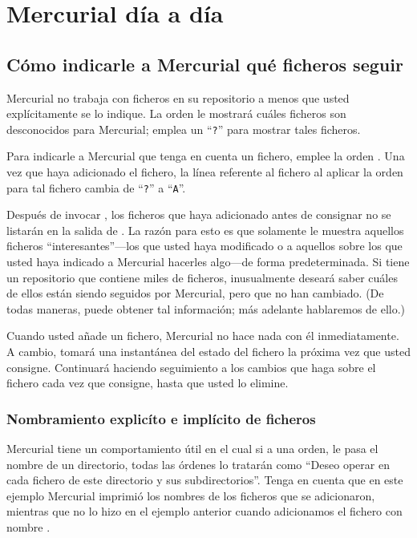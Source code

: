\chapter{Mercurial día a día}
\label{chap:daily}

\section{Cómo indicarle a Mercurial qué ficheros seguir}

Mercurial no trabaja con ficheros en su repositorio a menos que usted
explícitamente se lo indique.  La orden  le mostrará
cuáles ficheros son desconocidos para Mercurial; emplea un
``\texttt{?}'' para mostrar tales ficheros.

Para indicarle a Mercurial que tenga en cuenta un fichero, emplee la
orden . Una vez que haya adicionado el fichero, la línea
referente al fichero al aplicar la orden  para tal
fichero cambia de ``\texttt{?}'' a ``\texttt{A}''.

Después de invocar , los ficheros que haya adicionado
antes de consignar no se listarán en la salida de .  La
razón para esto es que  solamente le muestra aquellos
ficheros ``interesantes''---los que usted haya modificado o a aquellos
sobre los que usted haya indicado a Mercurial hacerles algo---de forma
predeterminada. Si tiene un repositorio que contiene miles de
ficheros, inusualmente deseará saber cuáles de ellos están siendo
seguidos por Mercurial, pero que no han cambiado.  (De todas maneras,
puede obtener tal información; más adelante hablaremos de ello.)


Cuando usted añade un fichero, Mercurial no hace nada con él inmediatamente.
A cambio, tomará una instantánea del estado del fichero la próxima vez
que usted consigne. Continuará haciendo seguimiento a los cambios que
haga sobre el fichero cada vez que consigne, hasta que usted lo elimine.

\subsection{Nombramiento explicíto e implícito de ficheros}

Mercurial tiene un comportamiento útil en el cual si a una orden,
le pasa el nombre de un directorio, todas las órdenes lo tratarán como
``Deseo operar en cada fichero de este directorio y sus 
subdirectorios''.
Tenga en cuenta que en este ejemplo Mercurial imprimió los nombres de
los ficheros que se adicionaron, mientras que no lo hizo en el ejemplo
anterior cuando adicionamos el fichero con nombre .

